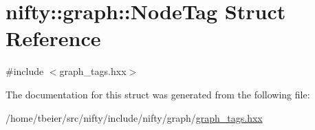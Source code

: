 \hypertarget{structnifty_1_1graph_1_1NodeTag}{}\section{nifty\+:\+:graph\+:\+:Node\+Tag Struct Reference}
\label{structnifty_1_1graph_1_1NodeTag}


{\ttfamily \#include $<$graph\+\_\+tags.\+hxx$>$}



The documentation for this struct was generated from the following file\+:\begin{DoxyCompactItemize}
\item 
/home/tbeier/src/nifty/include/nifty/graph/\hyperlink{graph__tags_8hxx}{graph\+\_\+tags.\+hxx}\end{DoxyCompactItemize}
